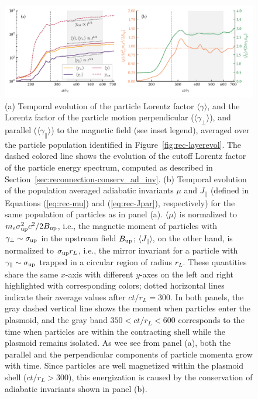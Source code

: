 \begin{figure}[htb]
    \centering
    \includegraphics[width=\textwidth]{figures/ch2-reconnection/fig7.pdf}
    \caption{(a)
    Temporal evolution of the particle Lorentz factor $\langle\gamma\rangle$, and the Lorentz factor of the particle motion perpendicular ($\langle\gamma_\perp\rangle$), and parallel ($\langle\gamma_{\parallel}\rangle$) to the magnetic field (see inset legend), averaged over the particle population identified in Figure~\ref{fig:rec-layerevol}. The dashed colored line shows the evolution of the cutoff Lorentz factor of the particle energy spectrum, computed as described in Section~\ref{sec:reconnection-conserv_ad_inv}. (b) Temporal evolution of the population averaged adiabatic invariants $\mu$ and $J_\parallel$ (defined in Equations (\ref{eq:rec-mu}) and (\ref{eq:rec-Jpar}), respectively) for the same population of particles as in panel (a). $\langle\mu\rangle$ is normalized to $m_e \sigma_{\rm up}^2 c^2/2B_{\rm up}$, i.e., the magnetic moment of particles with $\gamma_\perp\sim \sigma_{\rm up}$ in the upstream field $B_{\rm up}$; $\langle J_\parallel\rangle$, on the other hand, is normalized to $\sigma_{\rm up} r_L$, i.e., the mirror invariant for a particle with $\gamma_\parallel\sim\sigma_{\rm up}$ trapped in a circular region of radius $r_L$. These quantities share the same $x$-axis with different $y$-axes on the left and right highlighted with corresponding colors; dotted horizontal lines indicate their average values after $ct/r_L=300$.
    In both panels, the gray dashed vertical line shows the moment when particles enter the plasmoid, and the gray band $350<ct/r_L<600$ corresponds to the time when particles are within the contracting shell while the plasmoid remains isolated. As wee see from panel (a), both the parallel and the perpendicular components of particle momenta grow with time. Since particles are well magnetized within the plasmoid shell ($ct/r_L>300$), this energization is caused by the conservation of adiabatic invariants shown in panel (b).}
    \label{fig:rec-layer_gam_mu}
\end{figure}

